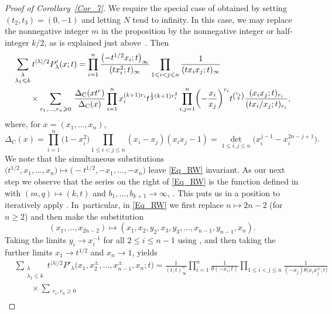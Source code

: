 \documentclass[pdftex]{sigma}
\numberwithin{equation}{section}
\renewcommand{\leq}{\leqslant}
\renewcommand{\geq}{\geqslant}
\newcommand{\abs}[1]{\vert#1\vert}
\newcommand{\la}{\lambda}
\begin{document}
\begin{proof}[Proof of Corollary~\ref{Cor_7}]
We require the special case of \cite[Proposition~5.10]{RW21} obtained
by setting $(t_2,t_3)=(0,-1)$ and letting $N$ tend to infinity.
In this case, we may replace the nonnegative integer $m$ in the
proposition by the nonnegative integer or half-integer $k/2$, as is
explained just above~\cite[equation~(5.2.32)]{RW21}.
Then
\begin{align}
&\sum_{\substack{\la \\[1pt] \la_1\leq k}} t^{\abs{\la}/2} P'_{\la}(x;t)
=\prod_{i=1}^n \frac{\bigl(-t^{1/2}x_i;t\bigr)_{\infty}}{(tx_i^2;t)_{\infty}}
\prod_{1\leq i<j\leq n} \frac{1}{(tx_ix_j;t)_{\infty}} \notag \\
&\qquad\times \sum_{r_1,\dots,r_n\geq 0}\,
\frac{\Delta_{\mathrm{C}}(xt^r)}{\Delta_{\mathrm{C}}(x)}
\prod_{i=1}^n x_i^{(k+1)r_i} t^{\frac{1}{2}(k+1)r_i^2}
\prod_{i,j=1}^n \biggl({-}\frac{x_i}{x_j}\biggr)^{r_i} t^{\binom{r_i}{2}}
\frac{(x_ix_j;t)_{r_i}}{(tx_i/x_j;t)_{r_i}}, \label{Eq_RW}
\end{align}
where, for $x=(x_1,\dots,x_n)$,
\[
\Delta_{\mathrm{C}}(x)=\prod_{i=1}^n \bigl(1-x_i^2\bigr)
\prod_{1\leq i<j\leq n} (x_i-x_j)(x_ix_j-1)
=\det_{1\leq i,j\leq n}\bigl(x_i^{j-1}-x_i^{2n-j+1}\bigr).
\]
We note that the simultaneous substitutions
$\bigl(t^{1/2},x_1,\dots,x_n\bigr)\mapsto \bigl(-t^{1/2},-x_1,\dots,-x_n\bigr)$
leave \eqref{Eq_RW} invariant.
As our next step we observe that the series on the right of
\eqref{Eq_RW} is the function
 defined in
\cite[equation~(A.1b)]{BW15} with $(m,q)\mapsto (k,t)$ and
${b_1,\dots,b_{k+1}\to\infty}$, .
This puts us in a position to iteratively apply \cite[Lemma A.1]{BW15}.
In~particular, in \eqref{Eq_RW} we first replace
$n\mapsto 2n-2$ (for $n\geq 2$) and then make the substitution
\[
(x_1,\dots,x_{2n-2})\mapsto
(x_1,x_2,y_2,x_3,y_3,\dots,x_{n-1},y_{n-1},x_n).
\]
Taking the limits $y_i\to x_i^{-1}$ for all $2\leq i\leq n-1$ using
\cite[Lemma A.1]{BW15}, and then taking the further limits
$x_1\to t^{1/2}$ and $x_n\to 1$, yields
\begin{align*}
&\sum_{\substack{\la \\[1pt] \la_1\leq k}} t^{\abs{\la}/2}
P'_{\la}\bigl(x_1,x_2^{\pm},\dots,x_{n-1}^{\pm},x_n;t\bigr)
=\frac{1}{(t;t)_{\infty}^n}
\prod_{i=1}^n \frac{1}{\theta(-x_i;t)}
\prod_{1\leq i<j\leq n} \frac{1}{(-x_j)\theta\bigl(x_ix_j^{\pm};t\bigr)} \\
&\qquad\times \sum_{\substack{r_1,r_n\geq 0 \\[1pt]
}}
\end{align*}
\end{proof}
\end{document}
